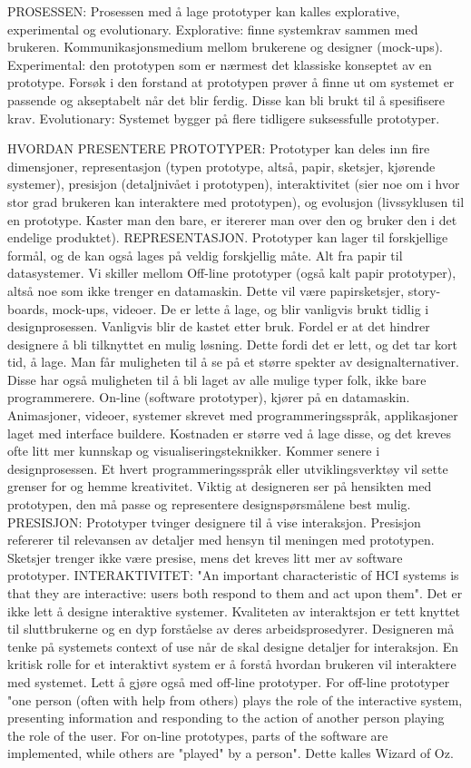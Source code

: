 PROSESSEN:
Prosessen med å lage prototyper kan kalles explorative, experimental og evolutionary. Explorative: finne systemkrav sammen med brukeren. Kommunikasjonsmedium mellom brukerene og designer (mock-ups). Experimental: den prototypen som er nærmest det klassiske konseptet av en prototype. Forsøk i den forstand at prototypen prøver å finne ut om systemet er passende og akseptabelt når det blir ferdig. Disse kan bli brukt til å spesifisere krav. Evolutionary: Systemet bygger på flere tidligere suksessfulle prototyper.

HVORDAN PRESENTERE PROTOTYPER:
Prototyper kan deles inn fire dimensjoner, representasjon (typen prototype, altså, papir, sketsjer, kjørende systemer), presisjon (detaljnivået i prototypen), interaktivitet (sier noe om i hvor stor grad brukeren kan interaktere med prototypen), og evolusjon (livssyklusen til en prototype. Kaster man den bare, er itererer man over den og bruker den i det endelige produktet). REPRESENTASJON. Prototyper kan lager til forskjellige formål, og de kan også lages på veldig forskjellig måte. Alt fra papir til datasystemer. Vi skiller mellom Off-line prototyper (også kalt papir prototyper), altså noe som ikke trenger en datamaskin. Dette vil være papirsketsjer, story-boards, mock-ups, videoer. De er lette å lage, og blir vanligvis brukt tidlig i designprosessen. Vanligvis blir de kastet etter bruk. Fordel er at det hindrer designere å bli tilknyttet en mulig løsning. Dette fordi det er lett, og det tar kort tid, å lage. Man får muligheten til å se på et større spekter av designalternativer. Disse har også muligheten til å bli laget av alle mulige typer folk, ikke bare programmerere. On-line (software prototyper), kjører på en datamaskin. Animasjoner, videoer, systemer skrevet med programmeringsspråk, applikasjoner laget med interface buildere. Kostnaden er større ved å lage disse, og det kreves ofte litt mer kunnskap og visualiseringsteknikker. Kommer senere i designprosessen. Et hvert programmeringsspråk eller utviklingsverktøy vil sette grenser for og hemme kreativitet. Viktig at designeren ser på hensikten med prototypen, den må passe og representere designspørsmålene best mulig. PRESISJON: Prototyper tvinger designere til å vise interaksjon. Presisjon refererer til relevansen av detaljer med hensyn til meningen med prototypen. Sketsjer trenger ikke være presise, mens det kreves litt mer av software prototyper. INTERAKTIVITET: "An important characteristic of HCI systems is that they are interactive: users both respond to them and act upon them". Det er ikke lett å designe interaktive systemer. Kvaliteten av interaktsjon er tett knyttet til sluttbrukerne og en dyp forståelse av deres arbeidsprosedyrer. Designeren må tenke på systemets context of use når de skal designe detaljer for interaksjon. En kritisk rolle for et interaktivt system er å forstå hvordan brukeren vil interaktere med systemet. Lett å gjøre også med off-line prototyper. For off-line prototyper "one person (often with help from others) plays the role of the interactive system, presenting information and responding to the action of another person playing the role of the user. For on-line prototypes, parts of the software are implemented, while others are "played" by a person". Dette kalles Wizard of Oz. 
